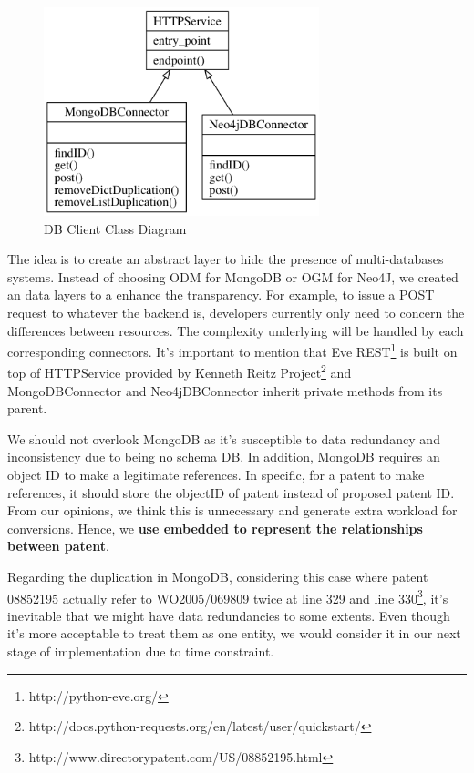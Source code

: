 \documentclass{article}
\begin{document}
\begin{figure}[H]
\centering
\includegraphics[width=80mm,scale=10]{db_client.png}
\caption{ DB Client Class Diagram \label{fig:db_client}}
\end{figure}

The idea is to create an abstract layer to hide the presence of multi-databases systems. Instead of choosing ODM for MongoDB or OGM for Neo4J, we created an data layers to a enhance the transparency. For example, to issue a POST request to whatever the backend is, developers currently only need to concern the differences between resources. The complexity underlying will be handled by each corresponding connectors. It's important to mention that Eve REST\footnote{http://python-eve.org/} is built on top of HTTPService provided by Kenneth Reitz Project\footnote{http://docs.python-requests.org/en/latest/user/quickstart/} and MongoDBConnector and Neo4jDBConnector inherit private methods from its parent. 

We should not overlook MongoDB as it's susceptible to data redundancy and inconsistency due to being no schema DB. In addition, MongoDB requires an object ID to make a legitimate references. In specific, for a patent to make references, it should store the objectID of patent instead of proposed patent ID. From our opinions, we think this is unnecessary and generate extra workload for conversions. Hence, we \textbf{use embedded to represent the relationships between patent}. 

Regarding the duplication in MongoDB, considering this case where patent 08852195 actually refer to WO2005/069809 twice at line 329 and line 330\footnote{http://www.directorypatent.com/US/08852195.html}, it's inevitable that we might have data redundancies to some extents. Even though it's more acceptable to treat them as one entity, we would consider it in our next stage of implementation due to time constraint.
\end{document}

